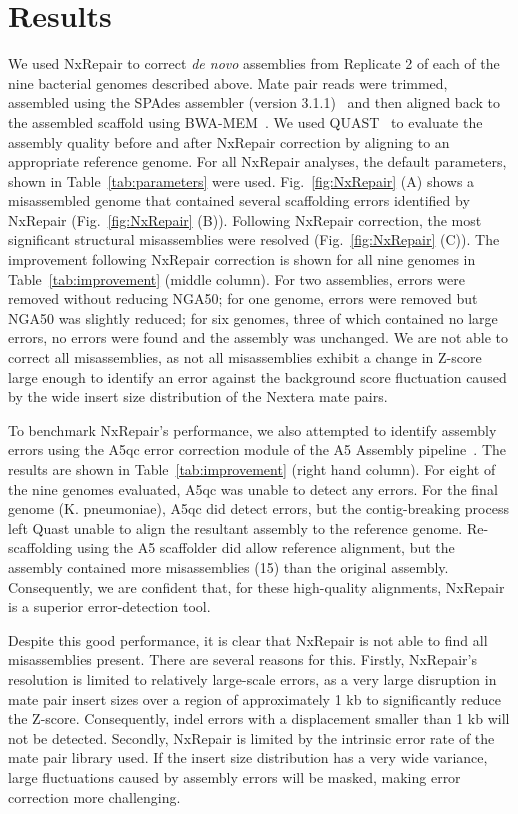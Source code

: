 \section{Results}
We used NxRepair to correct \textit{de novo} assemblies from Replicate 2 of each of the nine bacterial genomes described above. Mate pair reads were trimmed, assembled using the SPAdes assembler (version 3.1.1)~\cite{Bankevich2012} and then aligned back to the assembled scaffold using BWA-MEM~\cite{li2013}. We used QUAST~\cite{Gurevich2013} to evaluate the assembly quality before and after NxRepair correction by aligning to an appropriate reference genome. For all NxRepair analyses, the default parameters, shown in Table~\ref{tab:parameters} were used. Fig.~\ref{fig:NxRepair} (A) shows a misassembled genome that contained several scaffolding errors identified by NxRepair (Fig.~\ref{fig:NxRepair} (B)). Following NxRepair correction, the most significant structural misassemblies were resolved (Fig.~\ref{fig:NxRepair} (C)). The improvement following NxRepair correction is shown for all nine genomes in Table~\ref{tab:improvement} (middle column). For two assemblies, errors were removed without reducing NGA50; for one genome, errors were removed but NGA50 was slightly reduced; for six genomes, three of which contained no large errors, no errors were found and the assembly was unchanged. We are not able to correct all misassemblies, as not all misassemblies exhibit a change in Z-score large enough to identify an error against the background score fluctuation caused by the wide insert size distribution of the Nextera mate pairs. 

To benchmark NxRepair's performance, we also attempted to identify assembly errors using the A5qc error correction module of the A5 Assembly pipeline~\cite{tritt2012}. The results are shown in Table~\ref{tab:improvement} (right hand column). For eight of the nine genomes evaluated, A5qc was unable to detect any errors. For the final genome (K. pneumoniae), A5qc did detect errors, but the contig-breaking process left Quast unable to align the resultant assembly to the reference genome. Re-scaffolding using the A5 scaffolder did allow reference alignment, but the assembly contained more misassemblies (15) than the original assembly. Consequently, we are confident that, for these high-quality alignments, NxRepair is a superior error-detection tool. 

Despite this good performance, it is clear that NxRepair is not able to find all misassemblies present. There are several reasons for this. Firstly, NxRepair's resolution is limited to relatively large-scale errors, as a very large disruption in mate pair insert sizes over a region of approximately 1 kb to significantly reduce the Z-score. Consequently, indel errors with a displacement smaller than 1 kb will not be detected. Secondly, NxRepair is limited by the intrinsic error rate of the mate pair library used. If the insert size distribution has a very wide variance, large fluctuations caused by assembly errors will be masked, making error correction more challenging. 

